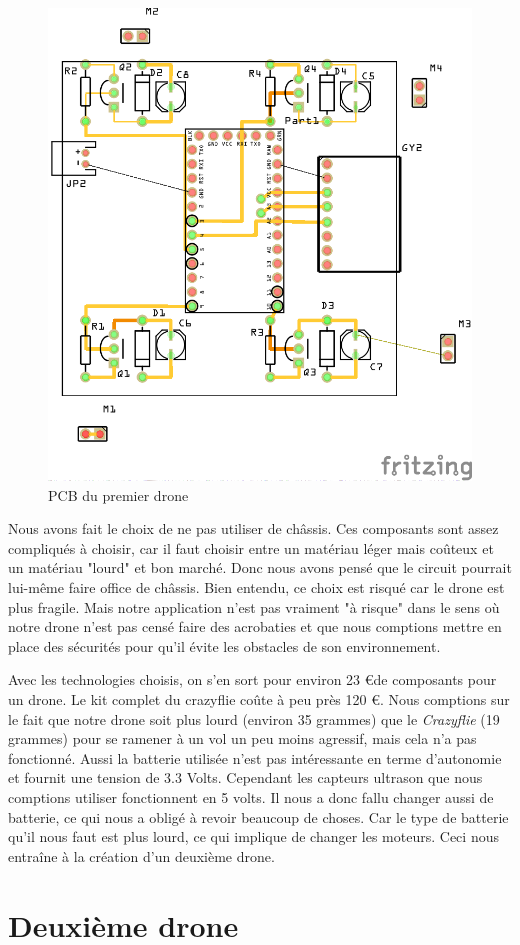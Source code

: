 \documentclass[a4paper,10pt]{report}
\begin{document}
      \begin{figure}[htbp]%
	\centering
	\includegraphics[scale = 0.8]{img/drone1_circuit_pcb.png}
	\caption{PCB du premier drone}
	\label{pcb1drone}
      \end{figure}
      
      \newpage
      Nous avons fait le choix de ne pas utiliser de châssis. Ces composants sont assez compliqués à choisir, car il faut choisir entre
      un matériau léger mais coûteux et un matériau "lourd" et bon marché. Donc nous avons pensé que le circuit pourrait lui-même faire
      office de châssis. Bien entendu, ce choix est risqué car le drone est plus fragile. Mais notre application n'est pas vraiment
      "à risque" dans le sens où notre drone n'est pas censé faire des acrobaties et que nous comptions mettre en place des sécurités
      pour qu'il évite les obstacles de son environnement.
      
      Avec les technologies choisis, on s'en sort pour environ 23 \euro de composants pour un drone. Le kit complet du crazyflie coûte
      à peu près 120 \euro. Nous comptions sur le fait que notre drone soit plus lourd (environ 35 grammes) que le \textit{Crazyflie} 
      (19 grammes) pour se ramener à un vol un peu moins agressif, mais cela n'a pas fonctionné. Aussi la batterie utilisée n'est pas
      intéressante en terme d'autonomie et fournit une tension de 3.3 Volts. Cependant les capteurs ultrason que nous comptions utiliser
      fonctionnent en 5 volts. Il nous a donc fallu changer aussi de batterie, ce qui nous a obligé à revoir beaucoup de choses. Car le type
      de batterie qu'il nous faut est plus lourd, ce qui implique de changer les moteurs. Ceci nous entraîne à la création d'un deuxième
      drone.
      
  \chapter{Deuxième drone}

  \listoffigures
  
  \raggedright
  
  
\end{document}
